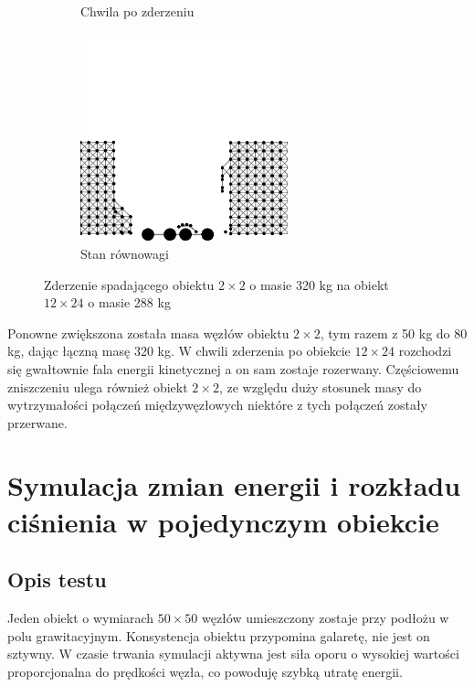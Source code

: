 \documentclass[12pt, letterpaper]{report}
\begin{document}
\begin{figure}[h]
\begin{subfigure}{0.5\textwidth}
            \caption{Chwila po zderzeniu}
        \end{subfigure}
        \begin{subfigure}{0.5\textwidth}
            \centering
            \includegraphics[width=6cm, height=6cm]{collision_2x2_24x12_mass80_4}
            \caption{Stan równowagi}
        \end{subfigure}
        
        \caption{Zderzenie spadającego obiektu $2 \times 2$ o masie 320 kg na obiekt $12 \times 24$ o masie 288 kg}
    \end{figure}

    Ponowne zwiększona została masa węzłów obiektu $2 \times 2$, tym razem z 50 kg do 80 kg, dając łączną masę 320 kg.
    W chwili zderzenia po obiekcie $12 \times 24$ rozchodzi się gwałtownie fala energii kinetycznej a on sam zostaje 
    rozerwany. Częściowemu zniszczeniu ulega również obiekt $2 \times 2$, ze względu duży stosunek masy do wytrzymałości
    połączeń międzywęzłowych niektóre z tych połączeń zostały przerwane.

    \clearpage
    \section{Symulacja zmian energii i rozkładu ciśnienia w pojedynczym obiekcie}
    \subsection{Opis testu}
    Jeden obiekt o wymiarach $50 \times 50$ węzłów umieszczony zostaje przy podłożu w polu grawitacyjnym.
    Konsystencja obiektu przypomina galaretę, nie jest on sztywny. W czasie trwania symulacji 
    aktywna jest siła oporu o wysokiej wartości proporcjonalna do prędkości węzła, co powoduję szybką 
    utratę energii.
\end{document}
